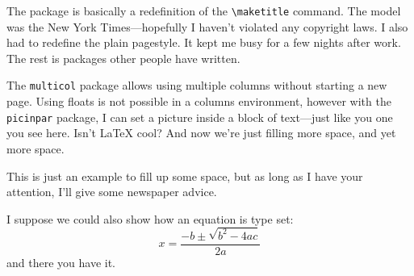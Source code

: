 \documentclass{article}
\date{June 20th 1995}
\begin{document}
\maketitle

\begin{multicols}{3}


The package is basically a redefinition of the \verb+\maketitle+ command.  The model was the New York Times---hopefully I haven't violated any copyright laws.  I also had to redefine the plain pagestyle.  It kept me busy for a few nights after work.  The rest is packages other people have written.      

\begin{window} The \verb+multicol+ package allows using multiple columns without starting a new page.  Using floats is not possible in a columns environment, however with the \verb+picinpar+ package, I can set a picture inside a block of text---just like you one you see here.  Isn't \LaTeX{} cool?
And now we're just filling more space, and yet more space.  
\end{window}
\closearticle


This is just an example to fill up some space, but as long as I have your attention, I'll give some newspaper advice.

I suppose we could also show how an equation is type set:
\begin{displaymath}
x=\frac{-b\pm\sqrt{b^2-4ac}}{2a}
\end{displaymath}
and there you have it.  

\lipsum[1-4]

\closearticle

\end{multicols}
\end{document}

